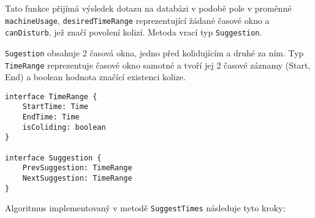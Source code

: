 Tato funkce přijímá výsledek dotazu na databázi v podobě pole v proměnné \texttt{machineUsage}, \texttt{desiredTimeRange} reprezentující žádané časové okno a \texttt{canDisturb}, jež značí povolení kolizí. Metoda vrací typ \texttt{Suggestion}.

\texttt{Sugestion} obsahuje 2 časová okna, jedno před kolidujícím a druhé za ním. Typ \texttt{TimeRange} reprezentuje časové okno samotné a tvoří jej 2 časové záznamy (Start, End) a boolean hodnota značící existenci kolize.

\begin{lstlisting}
interface TimeRange {
    StartTime: Time
    EndTime: Time
    isColiding: boolean
}

interface Suggestion {
    PrevSuggestion: TimeRange
    NextSuggestion: TimeRange
}
\end{lstlisting}
Algoritmus implementovaný v metodě \texttt{SuggestTimes} následuje tyto kroky:
